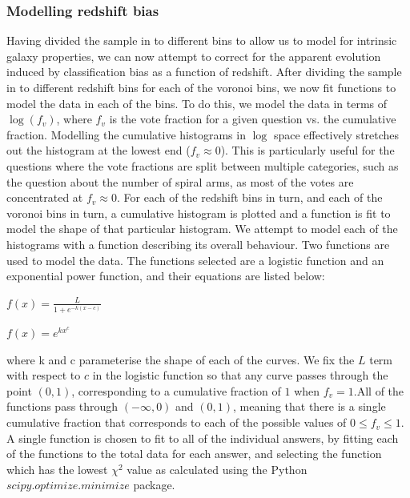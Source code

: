 \documentclass[useAMS,usenatbib]{mn2e}
\begin{document}
\subsubsection{Modelling redshift bias}

Having divided the sample in to different bins to allow us to model for intrinsic galaxy properties, we can now attempt to correct for the apparent evolution induced by classification bias as a function of redshift. After dividing the sample in to different redshift bins for each of the voronoi bins, we now fit functions to model the data in each of the bins. To do this, we model the data in terms of $\log(f_v)$, where $f_v$ is the vote fraction for a given question vs. the cumulative fraction. Modelling the cumulative histograms in $\log$ space effectively stretches out the histogram at the lowest end ($f_v \approx 0$). This is particularly useful for the questions where the vote fractions are split between multiple categories, such as the question about the number of spiral arms, as most of the votes are concentrated at $f_v \approx 0$. For each of the redshift bins in turn, and each of the voronoi bins in turn, a cumulative histogram is plotted and a function is fit to model the shape of that particular histogram. We attempt to model each of the histograms with a function describing its overall behaviour. Two functions are used to model the data. The functions selected are a logistic function and an exponential power function, and their equations are listed below:

\begin{center}
$f(x) = \frac{L}{1+e^{-k(x-c)}}$
\end{center}

\begin{center}
$f(x) = e^{kx^{c}}$
\end{center}

where k and c parameterise the shape of each of the curves. We fix the $L$ term with respect to $c$ in the logistic function so that any curve passes through the point $(0,1)$, corresponding to a cumulative fraction of $1$ when $f_v = 1$.All of the functions pass through $(-\infty,0)$ and $(0,1)$, meaning that there is a single cumulative fraction that corresponds to each of the possible values of $0 \leq f_v \leq 1$. A single function is chosen to fit to all of the individual answers, by fitting each of the functions to the total data for each answer, and selecting the function which has the lowest $\chi^2$ value as calculated using the Python $scipy.optimize.minimize$ package. 
\end{document}
